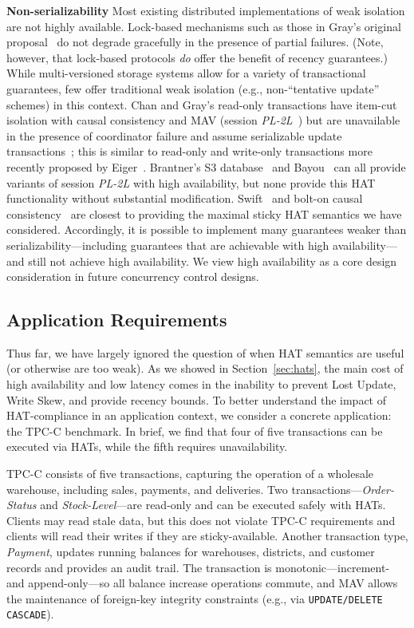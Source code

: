 \vspace{.5em}\noindent\textbf{Non-serializability} Most existing
distributed implementations of weak isolation are not highly
available. Lock-based mechanisms such as those in Gray's original
proposal~\cite{gray-isolation} do not degrade gracefully in the
presence of partial failures. (Note, however, that lock-based
protocols \textit{do} offer the benefit of recency guarantees.) While
multi-versioned storage systems allow for a variety of transactional
guarantees, few offer traditional weak isolation (e.g.,
non-``tentative update'' schemes) in this context.  Chan and Gray's
read-only transactions have item-cut isolation with causal consistency
and MAV (session \textit{PL-2L}~\cite{adya}) but are unavailable in
the presence of coordinator failure and assume serializable update
transactions~\cite{readonly}; this is similar to read-only and
write-only transactions more recently proposed by Eiger~\cite{eiger}.
Brantner's S3 database~\cite{kraska-s3} and
Bayou~\cite{sessionguarantees} can all provide variants of session
\textit{PL-2L} with high availability, but none provide this HAT
functionality without substantial modification. Swift~\cite{swift} and
bolt-on causal consistency~\cite{bolton} are closest to providing the
maximal sticky HAT semantics we have considered. Accordingly, it is
possible to implement many guarantees weaker than
serializability---including guarantees that are achievable with high
availability---and still not achieve high availability. We view high
availability as a core design consideration in future concurrency
control designs.

\subsection{Application Requirements}

Thus far, we have largely ignored the question of when HAT semantics
are useful (or otherwise are too weak). As we showed in
Section~\ref{sec:hats}, the main cost of high availability and low
latency comes in the inability to prevent Lost Update, Write Skew, and
provide recency bounds. To better understand the impact of
HAT-compliance in an application context, we consider a concrete
application: the TPC-C benchmark. In brief, we find that four of five
transactions can be executed via HATs, while the fifth requires
unavailability.

TPC-C consists of five transactions, capturing the operation of a
wholesale warehouse, including sales, payments, and deliveries. Two
transactions---\textit{Order-Status} and \textit{Stock-Level}---are
read-only and can be executed safely with HATs. Clients may read stale
data, but this does not violate TPC-C requirements and clients will
read their writes if they are sticky-available. Another transaction
type, \textit{Payment}, updates running balances for warehouses,
districts, and customer records and provides an audit trail. The
transaction is monotonic---increment- and append-only---so all balance
increase operations commute, and MAV allows the maintenance of
foreign-key integrity constraints (e.g., via \texttt{UPDATE/DELETE
  CASCADE}).

